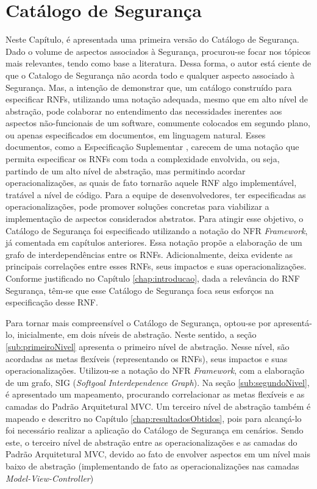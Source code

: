 \chapter{Catálogo de Segurança}
\label{chap:proposta}

Neste Capítulo, é apresentada uma primeira versão do Catálogo de Segurança. Dado o volume de aspectos associados à Segurança, procurou-se focar nos tópicos mais relevantes, tendo como base a literatura. Dessa forma, o autor está ciente de que o Catalogo de Segurança não acorda todo e qualquer aspecto associado à Segurança. Mas, a intenção de demonstrar que, um catálogo construído para especificar RNFs, utilizando uma notação adequada, mesmo que em alto nível de abstração, pode colaborar no entendimento das necessidades inerentes aos aspectos não-funcionais de um software, comumente colocados em segundo plano, ou apenas especificados em documentos, em linguagem natural. Esses documentos, como a Especificação Suplementar \cite{sommerville1997requirements}, carecem de uma notação que permita especificar os RNFs com toda a complexidade envolvida, ou seja, partindo de um alto nível de abstração, mas permitindo acordar operacionalizações, as quais de fato tornarão aquele RNF algo implementável, tratável a nível de código. Para a equipe de desenvolvedores, ter especificadas as operacionalizações, pode promover soluções concretas para viabilizar a implementação de aspectos considerados abstratos. Para atingir esse objetivo, o Catálogo de Segurança foi especificado utilizando a notação do NFR \textit{Framework}, já comentada em capítulos anteriores. Essa notação propõe a elaboração de um grafo de interdependências entre os RNFs. Adicionalmente, deixa evidente as principais correlações entre esses RNFs, seus impactos e suas operacionalizações. Conforme justificado no Capítulo \ref{chap:introducao}, dada a relevância do RNF Segurança, têm-se que esse Catálogo de Segurança foca seus esforços na especificação desse RNF.

Para tornar mais compreensível o Catálogo de Segurança, optou-se por apresentá-lo, inicialmente, em dois níveis de abstração. Neste sentido, a seção \ref{sub:primeiroNivel} apresenta o primeiro nível de abstração. Nesse nível, são acordadas as metas flexíveis (representando os RNFs), seus impactos e suas operacionalizações. Utilizou-se a notação do NFR \textit{Framework}, com a elaboração de um grafo, SIG (\textit{Softgoal Interdependence Graph}). Na seção \ref{sub:segundoNivel}, é apresentado um mapeamento, procurando correlacionar as metas flexíveis e as camadas do Padrão Arquitetural MVC. Um terceiro nível de abstração também é mapeado e descritro no Capítulo \ref{chap:resultadosObtidos}, pois para alcançá-lo foi necessário realizar a aplicação do Catálogo de Segurança em cenários. Sendo este, o terceiro nível de abstração entre as operacionalizações e as camadas do Padrão Arquitetural MVC, devido ao fato de envolver aspectos em um nível mais baixo de abstração (implementando de fato as operacionalizações nas camadas \textit{Model-View-Controller})

